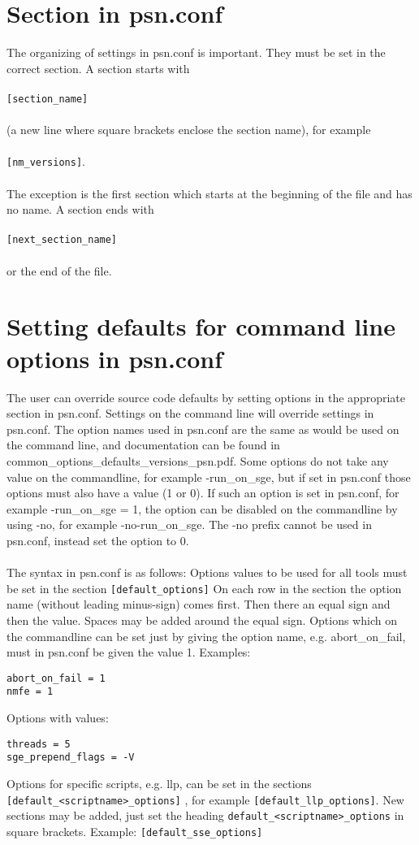 \documentclass[a4paper,12pt]{article}
\begin{document}
\section{Section in psn.conf}
The organizing of settings in psn.conf is important. They must be set in the correct section. A section starts with
\\
\\
\verb|[section_name]| 
\\
\\
(a new line where square brackets enclose the section name), for example
\\
\\
\verb|[nm_versions]|.
\\
\\
The exception is the first section which starts at the beginning of the file and has no name.
A section ends with 
\\
\\
\verb|[next_section_name]|
\\
\\
or the end of the file.

\section{Setting defaults for command line options in psn.conf}

The user can override source code defaults by setting options in the appropriate section in psn.conf. Settings on the command line will override settings in psn.conf. The option names used in psn.conf are the same as would be used on the command line, and documentation can be found in common\_options\_defaults\_versions\_psn.pdf. Some options do not take any value on the commandline, for example -run\_on\_sge, but if set in psn.conf those options must also have a value (1 or 0). If such an option is set in psn.conf, for example
-run\_on\_sge = 1, the option can be disabled on the commandline by using -no, for example 
-no-run\_on\_sge. The -no prefix cannot be used in psn.conf, instead set the option to 0.
\\
\\
The syntax in psn.conf is as follows: Options values to be used for all tools must be set in the section \verb|[default_options]| 
On each row in the section the option name (without leading minus-sign) comes first. Then there an equal sign and then the value. Spaces may be added around the equal sign. Options which on the commandline can be set just by giving the option name, e.g. abort\_on\_fail, must in psn.conf be given the value 1. Examples:
\begin{verbatim}
abort_on_fail = 1
nmfe = 1
\end{verbatim}
Options with values:
\begin{verbatim}
threads = 5
sge_prepend_flags = -V 
\end{verbatim}
Options for specific scripts, e.g. llp, can be set in the sections \verb|[default_<scriptname>_options]| , for example \verb|[default_llp_options]|. New sections may be added, just set the heading \verb|default_<scriptname>_options| in square brackets. Example:
\verb|[default_sse_options]|
\end{document}

